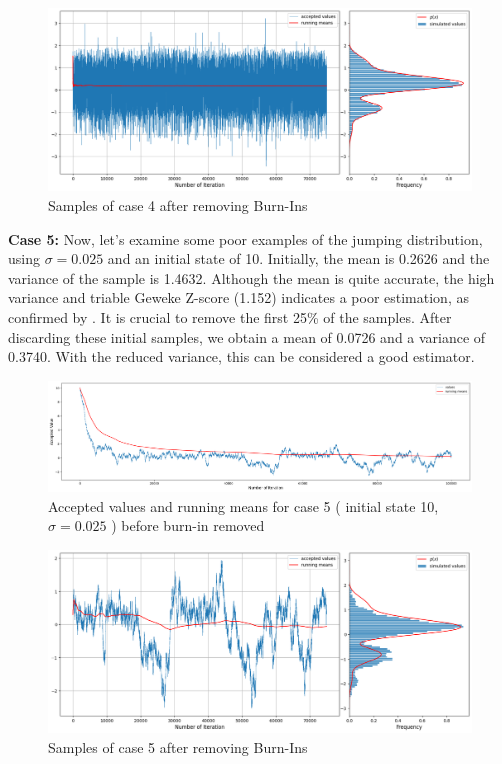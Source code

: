 \begin{example}
    \begin{figure}[H]
        \centering
        \includegraphics[width=1\textwidth]{./images/metropolis/example1/sample-4-value-hist-bo.png}
        \caption{Samples of case 4 after removing Burn-Ins}
    \end{figure}

    \textbf{Case 5:}  Now, let's examine some poor examples of the jumping distribution, using $\sigma = 0.025$ and an initial state of 10. Initially, the mean is 0.2626 and the variance of the sample is 1.4632. Although the mean is quite accurate, the high variance and triable Geweke Z-score (1.152) indicates a poor estimation, as confirmed by . It is crucial to remove the first 25\% of the samples. After discarding these initial samples, we obtain a mean of 0.0726 and a variance of 0.3740. With the reduced variance, this can be considered a good estimator.

    \begin{figure}[H]
        \centering
        \includegraphics[width=1\textwidth]{./images/metropolis/example1/sample-5-values.png}
        \caption{Accepted values and running means for case 5 ( initial state 10, $ \sigma = 0.025 $ ) before burn-in removed}
        \label{fig:MH sample5}
    \end{figure}
    
    \begin{figure}[H]
        \centering
        \includegraphics[width=1\textwidth]{./images/metropolis/example1/sample-5-value-hist-bo.png}
        \caption{Samples of case 5 after removing Burn-Ins}
    \end{figure}


\end{example}
